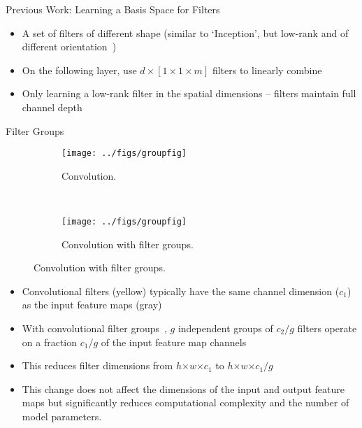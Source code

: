 \documentclass[final]{beamer}
\begin{document}
\begin{frame}{}
\begin{columns}[t]
\begin{column}{0.32\paperwidth}
\begin{block}{Previous Work: Learning a Basis Space for Filters}{}
\vspace{1em}

\begin{itemize}
    \item A set of filters of different shape (similar to `Inception', but low-rank and of different orientation~\cite{Szegedy2014going})
    \item On the following layer, use $d\times [1 \times 1 \times m]$ filters to linearly combine
    \item Only learning a low-rank filter in the spatial dimensions -- filters maintain full channel depth
\end{itemize}
\end{block}

\begin{block}{Filter Groups}

\begin{figure}[t]
\begin{subfigure}[t]{0.65\linewidth}
\centering
\texttt{[image: ../figs/groupfig]}
    \caption{Convolution.}
   \label{fig:normalconv}
\end{subfigure}
~
\begin{subfigure}[t]{0.65\linewidth}
\centering
\texttt{[image: ../figs/groupfig]}
   \caption{Convolution with filter groups.}
   \label{fig:groupedconv}
\end{subfigure}
\label{fig:groupconfig}
\end{figure}
\begin{itemize}
    \item Convolutional filters (yellow) typically have the same channel dimension ($c_1$) as the input feature maps (gray)
    \item With convolutional filter groups~\citep{Krizhevsky2012}, $g$ independent groups of $c_2/g$ filters operate on a fraction $c_1/g$ of the input feature map channels
    \item This reduces filter dimensions from $h$$\times$$w$$\times$$c_1$ to $h$$\times$$w$$\times$$c_1/g$
    \item This change does not affect the dimensions of the input and output feature maps but significantly reduces computational complexity and the number of model parameters.
\end{itemize}
\end{block}



\end{column}
\end{columns}
\end{frame}
\end{document}

